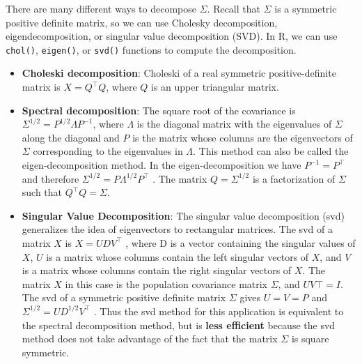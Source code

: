 \documentclass[
  letterpaper,
  DIV=11,
  numbers=noendperiod]{scrreprt}
\begin{document}
There are many different ways to decompose \(\Sigma\). Recall that
\(\Sigma\) is a symmetric positive definite matrix, so we can use
Cholesky decomposition, eigendecomposition, or singular value
decomposition (SVD). In R, we can use \texttt{chol()}, \texttt{eigen()},
or \texttt{svd()} functions to compute the decomposition.

\begin{itemize}
\item
  \textbf{Choleski decomposition}: Choleski of a real symmetric
  positive-definite matrix is \(X = Q^\top Q\), where \(Q\) is an upper
  triangular matrix.
\item
  \textbf{Spectral decomposition}: The square root of the covariance is
  \(Σ^{1/2} = P^{1/2} \Lambda P^{−1}\), where \(\Lambda\) is the
  diagonal matrix with the eigenvalues of \(\Sigma\) along the diagonal
  and \(P\) is the matrix whose columns are the eigenvectors of
  \(\Sigma\) corresponding to the eigenvalues in \(\Lambda\). This
  method can also be called the eigen-decomposition method. In the
  eigen-decomposition we have \(P^{-1}= P^\top\) and therefore
  \(Σ^{1/2} = P \Lambda^{1/2}P^\top\) . The matrix \(Q = Σ^{1/2}\) is a
  factorization of \(\Sigma\) such that \(Q^\top Q = \Sigma\).
\item
  \textbf{Singular Value Decomposition}: The singular value
  decomposition (svd) generalizes the idea of eigenvectors to
  rectangular matrices. The svd of a matrix \(X\) is \(X = U DV^\top\) ,
  where D is a vector containing the singular values of \(X\), \(U\) is
  a matrix whose columns contain the left singular vectors of \(X\), and
  \(V\) is a matrix whose columns contain the right singular vectors of
  \(X\). The matrix \(X\) in this case is the population covariance
  matrix \(\Sigma\), and \(UV\top = I\). The svd of a symmetric positive
  definite matrix \(\Sigma\) gives \(U = V = P\) and
  \(Σ^{1/2} = U D^{1/2}V^\top\) . Thus the svd method for this
  application is equivalent to the spectral decomposition method, but is
  \textbf{less efficient} because the svd method does not take advantage
  of the fact that the matrix \(\Sigma\) is square symmetric.
\end{itemize}
\end{document}
